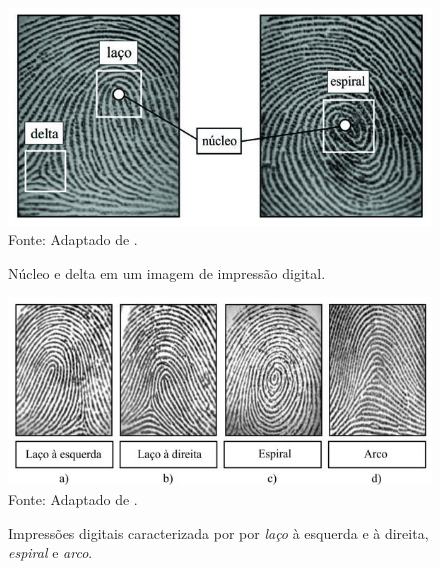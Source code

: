  
  \begin{figure}[!ht]
  \begin{center}
  \caption{Núcleo e delta em um imagem de impressão digital.}
  \includegraphics[scale=0.7]{figuras/cap2/nucleo.jpg}\\
  Fonte: Adaptado de \cite{maltoni2009handbook}.
  \label{nucleo}
  \end{center}
  \end{figure}
 
  \begin{figure}[!ht]
  \begin{center}
  \caption{Impressões digitais caracterizada por por \textit{laço} à esquerda e à direita, \textit{espiral} e \textit{arco}.}
  \includegraphics[scale=0.8]{figuras/cap2/regioes_singulares.jpg}\\
  Fonte: Adaptado de \cite{maltoni2009handbook}.
  \label{regioes_singulares}
  \end{center}
  \end{figure}
  
